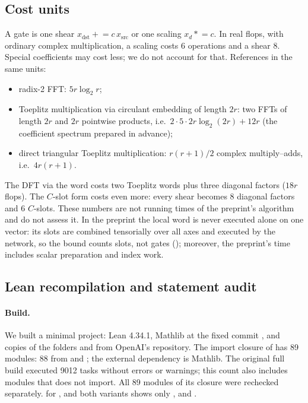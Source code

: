\documentclass[11pt]{article}
\theoremstyle{plain}
\begin{document}
\subsection{Cost units}\label{sec:cost-units}
A gate is one shear $x_{\mathrm{dst}}\mathrel{+}=c\,x_{\mathrm{src}}$ or one scaling $x_d\mathrel{*}=c$. In real flops, with ordinary complex multiplication, a scaling costs 6 operations and a shear 8. Special coefficients may cost less; we do not account for that. References in the same units:
\begin{itemize}
\item radix-2 FFT: $5r\log_2 r$;
\item Toeplitz multiplication via circulant embedding of length $2r$: two FFTs of length $2r$ and $2r$ pointwise products, i.e.\ $2\cdot5\cdot2r\log_2(2r)+12r$ (the coefficient spectrum prepared in advance);
\item direct triangular Toeplitz multiplication: $r(r+1)/2$ complex multiply--adds, i.e.\ $4r(r+1)$.
\end{itemize}
The DFT via the word costs two Toeplitz words plus three diagonal factors ($18r$ flops). The $C$-slot form costs even more: every shear becomes 8 diagonal factors and 6 $C$-slots. These numbers are not running times of the preprint's algorithm and do not assess it. In the preprint the local word is never executed alone on one vector: its slots are combined tensorially over all axes and executed by the network, so the bound counts slots, not gates (); moreover, the preprint's time includes scalar preparation and index work.

\subsection{Lean recompilation and statement audit}\label{sec:lean}
\paragraph{Build.}
We built a minimal project: Lean 4.34.1, Mathlib at the fixed commit , and copies of the folders  and  from OpenAI's repository. The import closure of  has 89 modules: 88 from  and ; the external dependency is Mathlib. The original full build executed 9012 tasks without errors or  warnings; this count also includes modules that  does not import. All 89 modules of its closure were rechecked separately.  for ,  and both  variants shows only ,  and .
\end{document}
